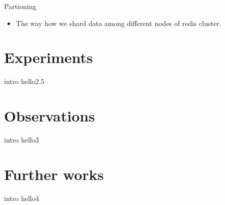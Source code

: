 \documentclass{beamer}
\begin{document}
\begin{frame}{Partioning}
\begin{itemize}
    \item The way how we shard data among different nodes of redis cluster.
\end{itemize}
\end{frame}

\section{Experiments}
\begin{frame}{intro}
hello2.5
\end{frame}


\section{Observations}
\begin{frame}{intro}
hello3
\end{frame}


\section{Further works}
\begin{frame}{intro}
hello4
\end{frame}
\end{document}
